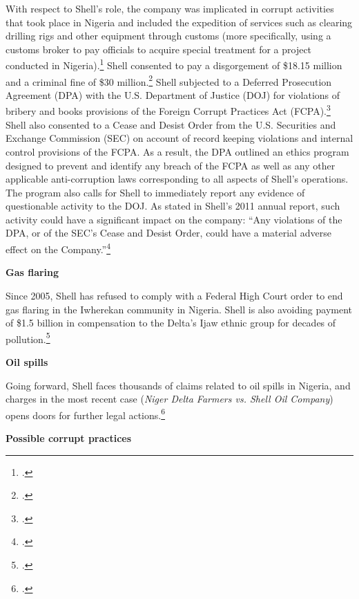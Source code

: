 With respect to Shell's role, the company was implicated in corrupt activities that took place in Nigeria and included the expedition of services such as clearing drilling rigs and other equipment through customs (more specifically, using a customs broker to pay officials to acquire special treatment for a project conducted in Nigeria).\footcite[][]{ShellBribes_2010}
Shell consented to pay a disgorgement of \$18.15 million and a criminal fine of \$30 million.\footcite[][]{SullivanCromwell_2010}
Shell subjected to a Deferred Prosecution Agreement (DPA) with the U.S. Department of Justice (DOJ) for violations of bribery and books provisions of the Foreign Corrupt Practices Act (FCPA).\footcite[][p.17]{Shell_2011}
Shell also consented to a Cease and Desist Order from the U.S. Securities and Exchange Commission (SEC) on account of record keeping violations and internal control provisions of the FCPA. 
As a result, the DPA outlined an ethics program designed to prevent and identify any breach of the FCPA as well as any other applicable anti-corruption laws corresponding to all aspects of Shell’s operations. 
The program also calls for Shell to immediately report any evidence of questionable activity to the DOJ. 
As stated in Shell's 2011 annual report, such activity could have a significant impact on the company: ``Any violations of the DPA, or of the SEC's Cease and Desist Order, could have a material adverse effect on the Company.''\footcite[][]{Shell_2011}



\textbf{Gas flaring}



Since 2005, Shell has refused to comply with a Federal High Court order to end gas flaring in the Iwherekan community in Nigeria. 
Shell is also avoiding payment of \$1.5 billion in compensation to the Delta’s Ijaw ethnic group for decades of pollution.\footcite[][]{Ukala_2011}



\textbf{Oil spills}



Going forward, Shell faces thousands of claims related to oil spills in Nigeria, and charges in the most recent case (\emph{Niger Delta Farmers vs. Shell Oil Company}) opens doors for further legal actions.\footcite[][]{MixedVerdict}



\textbf{Possible corrupt practices}



